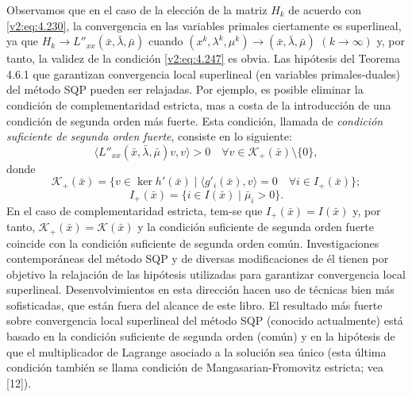 Observamos que en el caso de la elección de la matriz $H_k$ de acuerdo con \eqref{v2:eq:4.230}, la convergencia en las variables primales ciertamente es superlineal, ya que $H_k \to L''_{xx}(\bar{x}, \bar{\lambda}, \bar{\mu})$ cuando $(x^k, \lambda^k, \mu^k) \to (\bar{x}, \bar{\lambda}, \bar{\mu})$ $(k \to \infty)$ y, por tanto, la validez de la condición \eqref{v2:eq:4.247} es obvia.
Las hipótesis del Teorema 4.6.1 que garantizan convergencia local superlineal (en variables primales-duales) del método SQP pueden ser relajadas. Por ejemplo, es posible eliminar la condición de complementaridad estricta, mas a costa de la introducción de una condición de segunda orden más fuerte. Esta condición, llamada de \textit{condición suficiente de segunda orden fuerte}, consiste en lo siguiente:
\[
    \langle L''_{xx}(\bar{x}, \bar{\lambda}, \bar{\mu})v, v \rangle > 0 \quad \forall v \in \mathcal{K}_+(\bar{x}) \setminus \{0\},
\]
donde
\[
    \mathcal{K}_+(\bar{x}) = \{v \in \ker h'(\bar{x}) \mid \langle g'_i(\bar{x}), v \rangle = 0 \quad \forall i \in I_+(\bar{x})\};
\]
\[
    I_+(\bar{x}) = \{i \in I(\bar{x}) \mid \bar{\mu}_i > 0\}.
\]
En el caso de complementaridad estricta, tem-se que $I_+(\bar{x}) = I(\bar{x})$ y, por tanto, $\mathcal{K}_+(\bar{x}) = \mathcal{K}(\bar{x})$ y la condición suficiente de segunda orden fuerte coincide con la condición suficiente de segunda orden común.
Investigaciones contemporáneas del método SQP y de diversas modificaciones de él tienen por objetivo la relajación de las hipótesis utilizadas para garantizar convergencia local superlineal. Desenvolvimientos en esta dirección hacen uso de técnicas bien más sofisticadas, que están fuera del alcance de este libro. El resultado más fuerte sobre convergencia local superlineal del método SQP (conocido actualmente) está basado en la condición suficiente de segunda orden (común) y en la hipótesis de que el multiplicador de Lagrange asociado a la solución sea único (esta última condición también se llama condición de Mangasarian-Fromovitz estricta; vea [12]).
